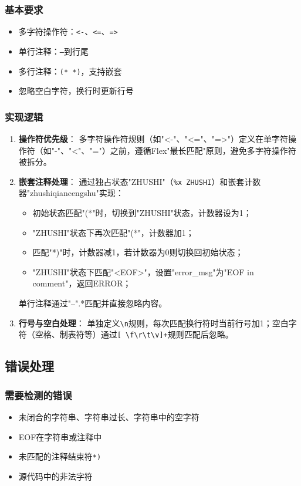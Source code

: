 \documentclass[twocolumn]{article}
\begin{document}
\subsubsection{基本要求}
\begin{itemize}
    \item 多字符操作符：\texttt{<-}、\texttt{<=}、\texttt{=>}
    \item 单行注释：\texttt{--}到行尾
    \item 多行注释：\texttt{(* *)}，支持嵌套
    \item 忽略空白字符，换行时更新行号
\end{itemize}

\subsubsection{实现逻辑}
\begin{enumerate}
    \item \textbf{操作符优先级}：
      多字符操作符规则（如"<-"、"<="、"=>"）定义在单字符操作符（如"-"、"<"、"="）之前，遵循Flex"最长匹配"原则，避免多字符操作符被拆分。

    \item \textbf{嵌套注释处理}：
      通过独占状态"ZHUSHI"（\texttt{\%x ZHUSHI}）和嵌套计数器"zhushiqiancengshu"实现：
      \begin{itemize}
          \item 初始状态匹配"(*"时，切换到"ZHUSHI"状态，计数器设为1；
          \item "ZHUSHI"状态下再次匹配"(*"，计数器加1；
          \item 匹配"*)"时，计数器减1，若计数器为0则切换回初始状态；
          \item "ZHUSHI"状态下匹配"<EOF>"，设置"error\_msg"为"EOF in comment"，返回ERROR；
      \end{itemize}
      单行注释通过"--".*匹配并直接忽略内容。

    \item \textbf{行号与空白处理}：
      单独定义\texttt{\textbackslash n}规则，每次匹配换行符时当前行号加1；空白字符（空格、制表符等）通过\texttt{[ \textbackslash f\textbackslash r\textbackslash t\textbackslash v]+}规则匹配后忽略。
\end{enumerate}


\subsection{错误处理}

\subsubsection{需要检测的错误}
\begin{itemize}
    \item 未闭合的字符串、字符串过长、字符串中的空字符
    \item EOF在字符串或注释中
    \item 未匹配的注释结束符\texttt{*)}
    \item 源代码中的非法字符
\end{itemize}
\end{document}
